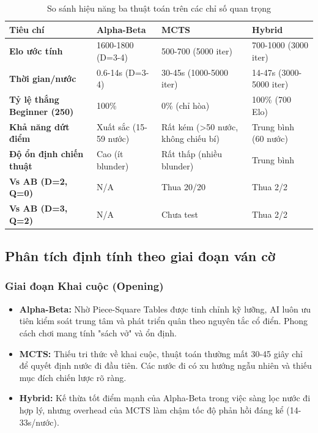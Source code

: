 \begin{table}[H]
    \centering
    \caption{So sánh hiệu năng ba thuật toán trên các chỉ số quan trọng}
    \label{tab:three_way_comparison}
    \begin{tabularx}{\textwidth}{|l|X|X|X|}
        \hline
        \textbf{Tiêu chí} & \textbf{Alpha-Beta} & \textbf{MCTS} & \textbf{Hybrid} \\ \hline
        \textbf{Elo ước tính} & 1600-1800 (D=3-4) & 500-700 (5000 iter) & 700-1000 (3000 iter) \\ \hline
        \textbf{Thời gian/nước} & 0.6-14s (D=3-4) & 30-45s (1000-5000 iter) & 14-47s (3000-5000 iter) \\ \hline
        \textbf{Tỷ lệ thắng Beginner (250)} & 100\% & 0\% (chỉ hòa) & 100\% (700 Elo) \\ \hline
        \textbf{Khả năng dứt điểm} & Xuất sắc (15-59 nước) & Rất kém (>50 nước, không chiếu bí) & Trung bình (60 nước) \\ \hline
        \textbf{Độ ổn định chiến thuật} & Cao (ít blunder) & Rất thấp (nhiều blunder) & Trung bình \\ \hline
        \textbf{Vs AB (D=2, Q=0)} & N/A & Thua 20/20 & Thua 2/2 \\ \hline
        \textbf{Vs AB (D=3, Q=2)} & N/A & Chưa test & Thua 2/2 \\ \hline
    \end{tabularx}
\end{table}

\subsection{Phân tích định tính theo giai đoạn ván cờ}

\subsubsection{Giai đoạn Khai cuộc (Opening)}

\begin{itemize}
    \item \textbf{Alpha-Beta:} Nhờ Piece-Square Tables được tinh chỉnh kỹ lưỡng, AI luôn ưu tiên kiểm soát trung tâm và phát triển quân theo nguyên tắc cổ điển. Phong cách chơi mang tính "sách vở" và ổn định.
    \item \textbf{MCTS:} Thiếu tri thức về khai cuộc, thuật toán thường mất 30-45 giây chỉ để quyết định nước đi đầu tiên. Các nước đi có xu hướng ngẫu nhiên và thiếu mục đích chiến lược rõ ràng.
    \item \textbf{Hybrid:} Kế thừa tốt điểm mạnh của Alpha-Beta trong việc sàng lọc nước đi hợp lý, nhưng overhead của MCTS làm chậm tốc độ phản hồi đáng kể (14-33s/nước).
\end{itemize}

